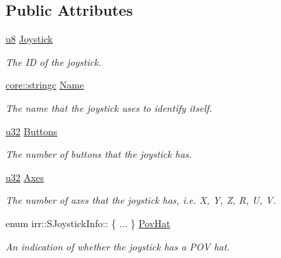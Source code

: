 \subsection*{Public Attributes}
\begin{DoxyCompactItemize}
\item 
\hyperlink{namespaceirr_a646874f69af8ff87fc10201b0254a761}{u8} \hyperlink{structirr_1_1SJoystickInfo_a691ed1bcdbf4ab3b30a4e9ed648c6d9d}{Joystick}
\begin{DoxyCompactList}\small\item\em The ID of the joystick. \end{DoxyCompactList}\item 
\hyperlink{namespaceirr_1_1core_ade1071a878633f2f6d8a75c5d11fec19}{core\+::stringc} \hyperlink{structirr_1_1SJoystickInfo_a56d229ae1e1d9f18b252c2f6bf886815}{Name}\hypertarget{structirr_1_1SJoystickInfo_a56d229ae1e1d9f18b252c2f6bf886815}{}\label{structirr_1_1SJoystickInfo_a56d229ae1e1d9f18b252c2f6bf886815}

\begin{DoxyCompactList}\small\item\em The name that the joystick uses to identify itself. \end{DoxyCompactList}\item 
\hyperlink{namespaceirr_a0416a53257075833e7002efd0a18e804}{u32} \hyperlink{structirr_1_1SJoystickInfo_a31422460c315e69bc057367cb66e4d23}{Buttons}\hypertarget{structirr_1_1SJoystickInfo_a31422460c315e69bc057367cb66e4d23}{}\label{structirr_1_1SJoystickInfo_a31422460c315e69bc057367cb66e4d23}

\begin{DoxyCompactList}\small\item\em The number of buttons that the joystick has. \end{DoxyCompactList}\item 
\hyperlink{namespaceirr_a0416a53257075833e7002efd0a18e804}{u32} \hyperlink{structirr_1_1SJoystickInfo_a0a09d1c3fc664207abaa610e5896b0c5}{Axes}
\begin{DoxyCompactList}\small\item\em The number of axes that the joystick has, i.\+e. X, Y, Z, R, U, V. \end{DoxyCompactList}\item 
enum irr\+::\+S\+Joystick\+Info\+:: \{ ... \}  \hyperlink{structirr_1_1SJoystickInfo_a2abf9d4741731c29fe4d9d64f7909d1e}{Pov\+Hat}
\begin{DoxyCompactList}\small\item\em An indication of whether the joystick has a P\+OV hat. \end{DoxyCompactList}\end{DoxyCompactItemize}


